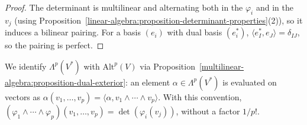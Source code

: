 \begin{proof}
The determinant is multilinear and alternating both in the $\varphi_i$ and in the $v_j$ (using
Proposition~\ref{linear-algebra:proposition-determinant-properties}(2)), so it induces a bilinear pairing.
For a basis $(e_i)$ with dual basis $(e_i^*)$, $\langle e_I^*, e_J \rangle = \delta_{IJ}$, so the pairing is perfect.
\end{proof}

\begin{notation}\label{multilinear-algebra:notation-forms}
We identify $\Lambda^p(V^*)$ with $\mathrm{Alt}^p(V)$ via
Proposition~\ref{multilinear-algebra:proposition-dual-exterior}: an element $\alpha \in \Lambda^p(V^*)$ is evaluated
on vectors as $\alpha(v_1, \ldots, v_p) = \langle \alpha, v_1 \wedge \cdots \wedge v_p \rangle$. With this convention,
$(\varphi_1 \wedge \cdots \wedge \varphi_p)(v_1, \ldots, v_p) = \det(\varphi_i(v_j))$, without a factor $1/p!$.
\end{notation}

